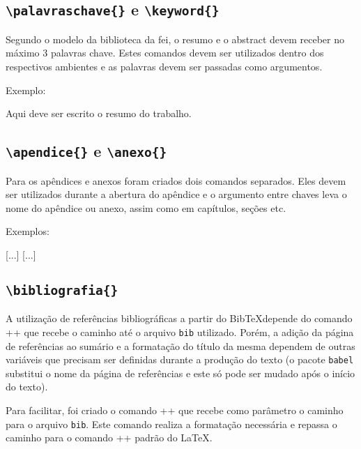 \documentclass{fei}
\begin{document}
    \subsection{\texttt{\textbackslash palavraschave\{\}} e \texttt{\textbackslash keyword\{\}}}
    Segundo o modelo da biblioteca da \gls{fei}, o resumo e o abstract devem receber no máximo 3 palavras chave. Estes comandos devem ser utilizados dentro dos respectivos ambientes e as palavras devem ser passadas como argumentos.

    Exemplo:
    \begin{latexcode}
    \begin{resumo}
    Aqui deve ser escrito o resumo do trabalho.

    \end{resumo}
    \end{latexcode}
    
    \subsection{\texttt{\textbackslash apendice\{\}} e \texttt{\textbackslash anexo\{\}}}
    Para os apêndices e anexos foram criados dois comandos separados. Eles devem ser utilizados durante a abertura do apêndice e o argumento entre chaves leva o nome do apêndice ou anexo, assim como em capítulos, seções etc.
    
    Exemplos:
    
    \begin{latexcode}
    [...]
    [...]
    \end{latexcode}

    \subsection{\texttt{\textbackslash bibliografia\{\}}}
    A utilização de referências bibliográficas a partir do Bib\TeX depende do comando \latexinline++ que recebe o caminho até o arquivo \texttt{bib} utilizado. Porém, a adição da página de referências ao sumário e a formatação do título da mesma dependem de outras variáveis que precisam ser definidas durante a produção do texto (o pacote \texttt{babel} substitui o nome da página de referências e este só pode ser mudado após o início do texto).

    Para facilitar, foi criado o comando \latexinline+\bibliografia{}+ que recebe como parâmetro o caminho para o arquivo \texttt{bib}. Este comando realiza a formatação necessária e repassa o caminho para o comando \latexinline++ padrão do \LaTeX.
\end{document}

